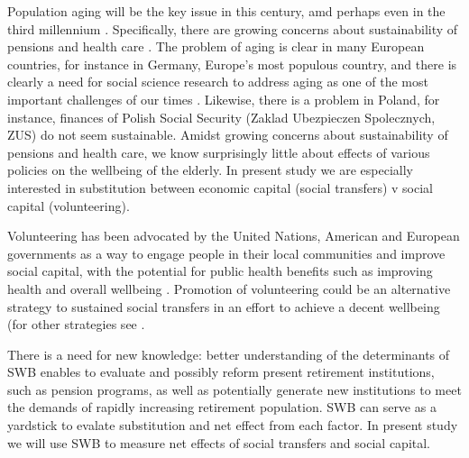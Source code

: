 \documentclass[10pt, letterpaper]{article}
\newcommand{\emd}[1]{\ExecuteMetaData[/tmp/tex]{#1}} %
\begin{document}
\begin{spacing}{1.4} %




Population aging will be the key issue in this century, amd perhaps even in 
the third
millennium  \citep{stolnitz1992demographic}. Specifically, there are growing
concerns about sustainability of pensions and health care \citep{jurges12}. 
The problem of aging is clear in many European countries, for instance in
Germany, Europe's most populous country, and there is clearly a need for social
science research to address aging as one of the most important challenges of our
times \citep{vaupel2006redistributing}. Likewise, there is a problem in
Poland, for instance, finances  of Polish Social Security (Zaklad Ubezpieczen
Spolecznych, ZUS) %
do not seem sustainable. 
%
Amidst growing concerns about sustainability of pensions and health care, we
know surprisingly little about effects of various policies on the wellbeing of the elderly.%
In present study %
we are especially interested in substitution between economic
capital (social transfers) v social capital (volunteering). %

Volunteering has been advocated by the United Nations, American and European
governments as a way to engage people in their local communities and improve
social capital, with the potential for public health benefits such as improving
health and overall wellbeing 
\citep{jenkinson2013volunteering}. Promotion of volunteering could be an
alternative 
strategy to sustained social transfers in an effort to achieve a decent
wellbeing (for other strategies see \citet[][sec. 2.4.5]{ferring10}. 

There is a need for new knowledge: better understanding of the determinants of
SWB enables to evaluate and possibly reform present retirement
institutions, such as pension programs, as well
as potentially generate new institutions to meet the demands of rapidly
increasing retirement population. SWB can serve as a yardstick to evalate
substitution and net effect from each factor. In present study we will use SWB
to measure net effects of social transfers and social capital.


\end{spacing}
\end{document}
